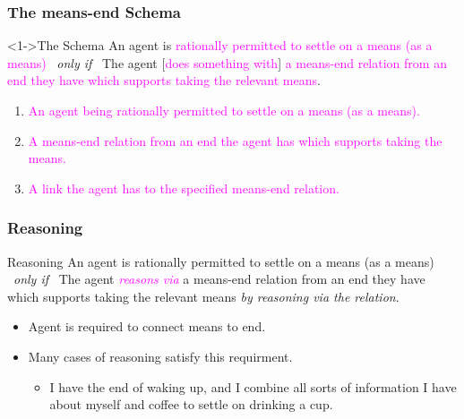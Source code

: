 \documentclass[noamssymb, compress, handout]{beamer} %
\begin{document}
\begin{frame}
  \frametitle{The means-end Schema}

  \begin{block}<1->{The Schema}
    An agent is \textcolor<3>{fuchsia}{rationally permitted to settle on a means (as a means)}
    \newline
    \mbox{ }\hfill\emph{only if}\hfill\mbox{ }
    \newline
    The agent [\textcolor<5>{fuchsia}{does something with}] \textcolor<4>{fuchsia}{a means-end relation from an end they have which supports taking the relevant means}.
  \end{block}

  \begin{enumerate}%
  \item<3-5> \textcolor<3>{fuchsia}{An agent being rationally permitted to settle on a means (as a means).}
  \item<4-5> \textcolor<4>{fuchsia}{A means-end relation from an end the agent has which supports taking the means.}
  \item<5-5> \textcolor<5>{fuchsia}{A link the agent has to the specified means-end relation.}
  \end{enumerate}
\end{frame}

\begin{frame}
  \frametitle{Reasoning}

  \begin{block}{Reasoning}
    An agent is rationally permitted to settle on a means (as a means)
    \newline
    \mbox{ }\hfill\emph{only if}\hfill\mbox{ }
    \newline
    The agent \textcolor{fuchsia}{\emph{reasons via}} a means-end relation from an end they have which supports taking the relevant means \emph{by reasoning via the relation}.
  \end{block}

  \begin{itemize}
  \item Agent is required to connect means to end.
  \item Many cases of reasoning satisfy this requirment.
    \begin{itemize}
    \item I have the end of waking up, and I combine all sorts of information I have about myself and coffee to settle on drinking a cup.
    \end{itemize}
  \end{itemize}
\end{frame}
\end{document}
